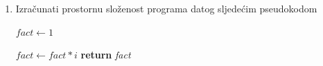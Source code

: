 \begin{enumerate}
\item Izračunati prostornu složenost programa datog sljedećim pseudokodom
 
\begin{algorithm}[H]
	\begin{algorithmic}[1]
	  	\State $fact \gets 1$
	  	   
	  	   \State	$fact \gets fact * i$
	  	 \EndFor
	  	\State \textbf{return} \textit{fact}
	  \EndProcedure
	\end{algorithmic}
\end{algorithm}
 


\end{enumerate}